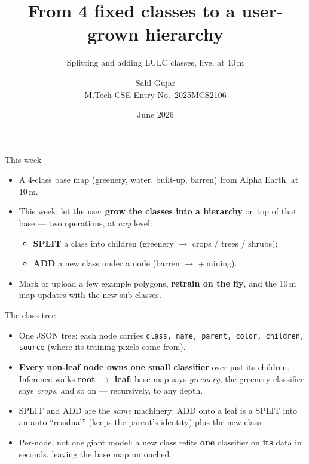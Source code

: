 \documentclass[aspectratio=169]{beamer}
\title[Refining the LULC map]{From 4 fixed classes to a user-grown hierarchy}
\subtitle{Splitting and adding LULC classes, live, at 10\,m}
\author[Salil Gujar]{Salil Gujar \\ \footnotesize M.Tech CSE \quad Entry No.\ 2025MCS2106}
\date{June 2026}
\begin{document}
\frame{\titlepage}

\begin{frame}{This week}
\begin{itemize}
  \item A 4-class base map (greenery, water, built-up, barren) from Alpha Earth, at 10\,m.
  \item This week: let the user \textbf{grow the classes into a hierarchy} on top of that
  base --- two operations, at \emph{any} level:
  \begin{itemize}
    \item \textbf{SPLIT} a class into children (greenery $\to$ crops / trees / shrubs);
    \item \textbf{ADD} a new class under a node (barren $\to$ +\,mining).
  \end{itemize}
  \item Mark or upload a few example polygons, \textbf{retrain on the fly}, and the 10\,m
  map updates with the new sub-classes.
\end{itemize}
\end{frame}

\begin{frame}{The class tree}
\begin{itemize}
  \item One JSON tree; each node carries \texttt{class, name, parent, color, children,
  source} (where its training pixels come from).
  \item \textbf{Every non-leaf node owns one small classifier} over just its children.
  Inference walks \textbf{root $\to$ leaf}: base map says \emph{greenery}, the greenery
  classifier says \emph{crops}, and so on --- recursively, to any depth.
  \item SPLIT and ADD are the \emph{same} machinery: ADD onto a leaf is a SPLIT into an
  auto ``residual'' (keeps the parent's identity) plus the new class.
  \item Per-node, not one giant model: a new class refits \textbf{one} classifier on
  \textbf{its} data in seconds, leaving the base map untouched.
\end{itemize}
\end{frame}
\end{document}
